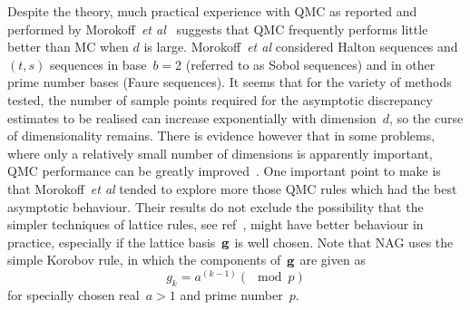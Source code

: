 Despite the theory, much practical experience with QMC
as reported and performed by Morokoff~\emph{et al}~\cite{Mo94Quas,Mo95Quas}
suggests that QMC frequently performs little better than MC
when $d$ is large. Morokoff~\emph{et al} considered Halton sequences
and $(t,s)$ sequences in base~$b=2$ (referred to as Sobol sequences)
and in other prime number bases (Faure sequences).
It seems that for the variety of methods tested,
the number of sample points required for the asymptotic discrepancy
estimates to be realised can increase exponentially with dimension~$d$,
so the curse of dimensionality remains.
There is evidence however that in some problems, where only a relatively small
number of dimensions is apparently important, QMC performance
can be greatly improved~\cite{Ca97Valu}. One important point to make
is that Morokoff~\emph{et al} tended to explore more those QMC
rules which had the best asymptotic behaviour. Their results do not
exclude the possibility that the simpler techniques of
lattice rules, see ref~\cite[\S\,5.1]{niederreiter},
might have better behaviour in
practice, especially if the lattice basis~${\bf g}$ is well chosen.
Note that NAG uses the simple Korobov rule, in which the components of~${\bf g}$
are given as
\begin{equation}
g_k = a^{(k-1)} (\mod p)
\end{equation}
 for specially chosen real~$a>1$ and prime number~$p$.


